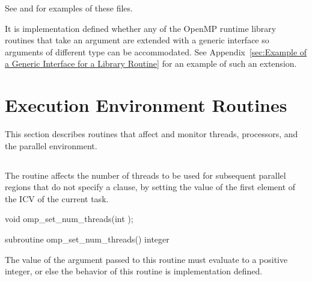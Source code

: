 See  
and  
for examples of these files.

It is implementation defined whether any of the OpenMP runtime library routines that 
take an argument are extended with a generic interface so arguments of different  
type can be accommodated. See Appendix~\ref{sec:Example of a Generic Interface for a Library Routine}
for an example of such an extension. 
\fortranspecificend









\section{Execution Environment Routines}
\label{sec:Execution Environment Routines}
This section describes routines that affect and monitor threads, processors, and the 
parallel environment. 






\subsection{}
\label{subsec:omp_set_num_threads}
\summary
The  routine affects the number of threads to be used for 
subsequent parallel regions that do not specify a  clause, by setting the 
value of the first element of the  ICV of the current task.

\format
\ccppspecificstart
\begin{boxedcode}
void omp\_set\_num\_threads(int );
\end{boxedcode}
\ccppspecificend

\fortranspecificstart
\begin{boxedcode}
subroutine omp\_set\_num\_threads()
integer 
\end{boxedcode}
\fortranspecificend

\constraints
The value of the argument passed to this routine must evaluate to a positive integer, or 
else the behavior of this routine is implementation defined.

